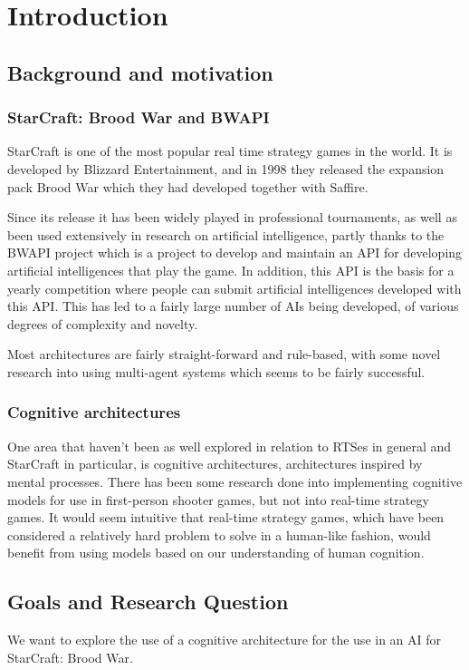 \chapter{Introduction}

\section{Background and motivation}
\subsection{StarCraft: Brood War and BWAPI}
StarCraft is one of the most popular real time strategy games in the world. It
is developed by Blizzard Entertainment, and in 1998 they released the expansion
pack Brood War which they had developed together with Saffire.

Since its release it has been widely played in professional tournaments, as
well as been used extensively in research on artificial intelligence, partly
thanks to the BWAPI project which is a project to develop and maintain an API
for developing artificial intelligences that play the game. In addition, this
API is the basis for a yearly competition where people can submit artificial
intelligences developed with this API. This has led to a fairly large number of
AIs being developed, of various degrees of complexity and novelty.

Most architectures are fairly straight-forward and rule-based, with some
novel research into using multi-agent systems which seems to be fairly
successful.

\subsection{Cognitive architectures}
One area that haven't been as well explored in relation to RTSes in general and
StarCraft in particular, is cognitive architectures, architectures inspired by
mental processes. There has been some research done into implementing cognitive
models for use in first-person shooter games, but not into real-time strategy
games. It would seem intuitive that real-time strategy games, which have been
considered a relatively hard problem to solve in a human-like fashion, would
benefit from using models based on our understanding of human cognition.


\section{Goals and Research Question}
We want to explore the use of a cognitive architecture for the use in an AI for
StarCraft: Brood War.

